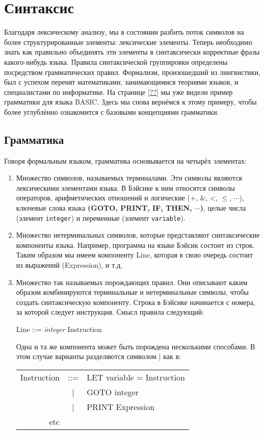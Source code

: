 \section{Синтаксис}

Благодаря лексическому анализу, мы в состоянии разбить поток символов на более
структурированные элементы: лексические элементы. Теперь необходимо знать как
правильно объединять эти элементы в синтаксически корректные фразы какого-нибудь
языка. Правила синтаксической группировки определены посредством грамматических
правил. Формализм, произошедший из лингвистики, был с успехом перенят
математиками, занимающимися теориями языков, и специалистами по информатике. На
странице \ref{??} мы уже видели пример грамматики для языка BASIC. Здесь мы
снова вернёмся к этому примеру, чтобы более углублённо ознакомится с базовыми
концепциями грамматики.

\subsection{Грамматика}

Говоря формальным языком, грамматика основывается на четырёх элементах:

\begin{enumerate}
	\item Множество символов, называемых терминалами. Эти символы являются
лексическими элементами языка. В Бэйсике к ним относятся символы операторов,
арифметических отношений и логические (+, $\&$, <, $\le$, $\cdots$), ключевые
слова языка {\bf (GOTO, PRINT, IF, THEN, $\cdots$)}, целые числа (элемент
\texttt{integer}) и переменные (элемент \texttt{variable}).

	\item Множество нетерминальных символов, которые представляют
синтаксические компоненты языка. Например, программа на языке Бэйсик состоит из
строк. Таким образом мы имеем компоненту Line, которая в свою очередь
состоит из выражений (Expression), и т.д.

	\item Множество так называемых порождающих правил. Они описывают каким
образом комбинируются терминальные и нетерминальные символы, чтобы создать
синтаксическую компоненту. Строка в Бэйсике начинается с номера, за которой
следует инструкция. Смысл правила следующий:

\begin{center}
	Line ::= {\it integer} Instruction
\end{center}

Одна и та же компонента может быть порождена несколькими способами. В этом
случае варианты разделяются символом | как в:

\begin{center}
	\begin{tabular}{rcl}
		Instruction & ::= & LET variable = Instruction \\
		 & | & GOTO integer \\
		 & | & PRINT Expression \\
		etc & &
	\end{tabular}
\end{center}


\end{enumerate}

